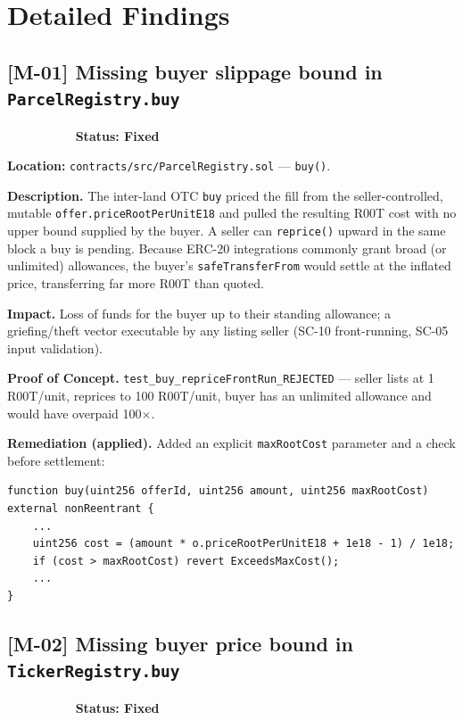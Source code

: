 \documentclass[11pt,a4paper]{article}
\newcommand{\sev}[2]{\textcolor{#1}{\textbf{#2}}}
\newcommand{\badge}[2]{\colorbox{#1}{\textcolor{white}{\bfseries\,#2\,}}}
\begin{document}
\section{Detailed Findings}

\subsection{[M-01] Missing buyer slippage bound in \texttt{ParcelRegistry.buy}}
\label{sec:m02}
\noindent\badge{sevmed}{MEDIUM}\quad\textbf{Status: \sev{r00tgreen}{Fixed}}

\textbf{Location:} \texttt{contracts/src/ParcelRegistry.sol} — \texttt{buy()}.

\textbf{Description.} The inter-land OTC \texttt{buy} priced the fill from the
seller-controlled, mutable \texttt{offer.priceRootPerUnitE18} and pulled the
resulting R00T cost with no upper bound supplied by the buyer. A seller can
\texttt{reprice()} upward in the same block a buy is pending. Because ERC-20
integrations commonly grant broad (or unlimited) allowances, the buyer's
\texttt{safeTransferFrom} would settle at the inflated price, transferring far
more R00T than quoted.

\textbf{Impact.} Loss of funds for the buyer up to their standing allowance;
a griefing/theft vector executable by any listing seller (SC-10 front-running,
SC-05 input validation).

\textbf{Proof of Concept.} \texttt{test\_buy\_repriceFrontRun\_REJECTED} — seller
lists at 1 R00T/unit, reprices to 100 R00T/unit, buyer has an unlimited allowance
and would have overpaid 100$\times$.

\textbf{Remediation (applied).} Added an explicit \texttt{maxRootCost} parameter and
a check before settlement:
\begin{lstlisting}
function buy(uint256 offerId, uint256 amount, uint256 maxRootCost) external nonReentrant {
    ...
    uint256 cost = (amount * o.priceRootPerUnitE18 + 1e18 - 1) / 1e18;
    if (cost > maxRootCost) revert ExceedsMaxCost();
    ...
}
\end{lstlisting}

\subsection{[M-02] Missing buyer price bound in \texttt{TickerRegistry.buy}}
\noindent\badge{sevmed}{MEDIUM}\quad\textbf{Status: \sev{r00tgreen}{Fixed}}
\end{document}
